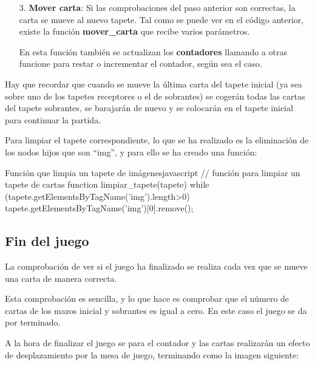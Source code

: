 \documentclass{\ClassPath/viu-tfm-template}
\begin{document}
\vspace{-1em}
\begin{enumerate}
    \item[3.] \textbf{Mover carta}: Si las comprobaciones del paso anterior son correctas, la carta se mueve al nuevo tapete. Tal como se puede ver en el código anterior, existe la función \textbf{mover\_carta} que recibe varios parámetros.

    En esta función también se actualizan los \textbf{contadores} llamando a otras funcione para restar o incrementar el contador, según sea el caso.
\end{enumerate}
\vspace{-1em}

Hay que recordar que cuando se mueve la última carta del tapete inicial (ya sea sobre uno de los tapetes receptores o el de sobrantes) se cogerán todas las cartas del tapete sobrantes, se barajarán de nuevo y se colocarán en el tapete inicial para continuar la partida.

Para limpiar el tapete correspondiente, lo que se ha realizado es la eliminación de los nodos hijos que son “img”, y para ello se ha creado una función:
\begin{mycode}{Función que limpia un tapete de imágenes}{javascript}{}
// función para limpiar un tapete de cartas
function limpiar_tapete(tapete) {
    while (tapete.getElementsByTagName('img').length>0) {
        tapete.getElementsByTagName('img')[0].remove();
    }
}
\end{mycode}



\subsection{Fin del juego}
La comprobación de ver si el juego ha finalizado se realiza cada vez que se mueve una carta de manera correcta.

Esta comprobación es sencilla, y lo que hace es comprobar que el número de cartas de los mazos inicial y sobrantes es igual a cero. En este caso el juego se da por terminado.

A la hora de finalizar el juego se para el contador y las cartas realizarán un efecto de desplazamiento por la mesa de juego, terminando como la imagen siguiente:
\end{document}
